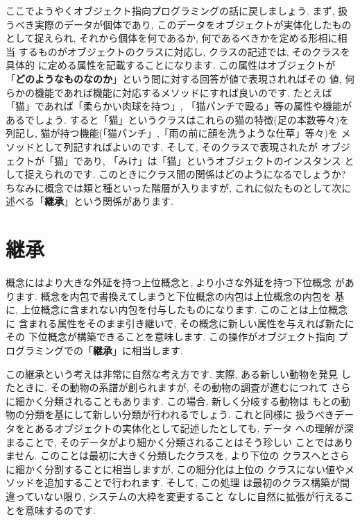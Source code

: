 \documentclass[b5j,8pt,twocolumn]{ltjsarticle}
\begin{document}
ここでようやくオブジェクト指向プログラミングの話に戻しましょう. まず,
 扱うべき実際のデータが個体であり, このデータをオブジェクトが実体化したもの
として捉えられ, それから個体を何であるか, 何であるべきかを定める形相に相当
するものがオブジェクトのクラスに対応し, クラスの記述では, そのクラスを具体的
に定める属性を記載することになります. この属性はオブジェクトが
「\textbf{どのようなものなのか}」という問に対する回答が値で表現されればその
値,  何らかの機能であれば機能に対応するメソッドにすれば良いのです. たとえば
「猫」であれば「柔らかい肉球を持つ」, 「猫パンチで殴る」等の属性や機能が
あるでしょう. すると「猫」というクラスはこれらの猫の特徴(足の本数等々)を
列記し, 猫が持つ機能(「猫パンチ」,「雨の前に顔を洗うような仕草」等々)を
メソッドとして列記すればよいのです. そして, そのクラスで表現されたが
オブジェクトが「猫」であり, 「みけ」は「猫」というオブジェクトのインスタンス
として捉えられのです. このときにクラス間の関係はどのようになるでしょうか?
 ちなみに概念では類と種といった階層が入りますが, これに似たものとして次に
述べる「\textbf{継承}」という関係があります.


\section{継承}


概念にはより大きな外延を持つ上位概念と, より小さな外延を持つ下位概念
があります. 概念を内包で書換えてしまうと下位概念の内包は上位概念の内包を
基に, 上位概念に含まれない内包を付与したものになります. このことは上位概念に
含まれる属性をそのまま引き継いで, その概念に新しい属性を与えれば新たにその
下位概念が構築できることを意味します. この操作がオブジェクト指向
プログラミングでの「\textbf{継承}」に相当します.
\newline


この継承という考えは非常に自然な考え方です. 実際, ある新しい動物を発見
したときに, その動物の系譜が創られますが, その動物の調査が進むにつれて
さらに細かく分類されることもあります. この場合, 新しく分岐する動物は
もとの動物の分類を基にして新しい分類が行われるでしょう. これと同様に
扱うべきデータをとあるオブジェクトの実体化として記述したとしても, データ
への理解が深まることで, そのデータがより細かく分類されることはそう珍しい
ことではありません. このことは最初に大きく分類したクラスを, より下位の
クラスへとさらに細かく分割することに相当しますが, この細分化は上位の
クラスにない値やメソッドを追加することで行われます. そして, この処理
は最初のクラス構築が間違っていない限り, システムの大枠を変更すること
なしに自然に拡張が行えることを意味するのです.
\newline
\end{document}
